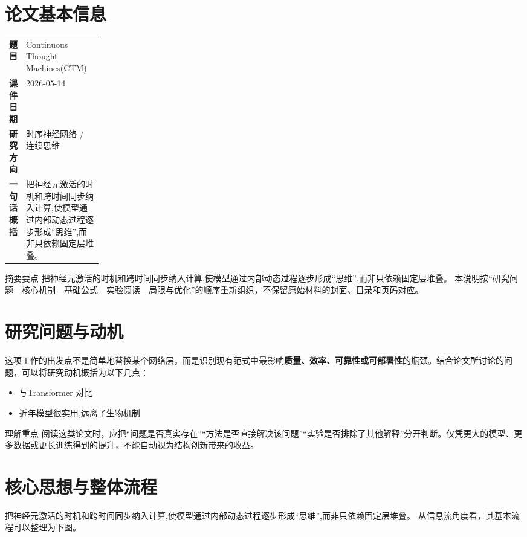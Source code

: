 \documentclass[UTF8,11pt,a4paper]{ctexart}
\newcommand{\term}[1]{\textbf{\textcolor{mainblue}{#1}}}
\begin{document}
\section{论文基本信息}
\begin{center}
\begin{tabularx}{0.94\linewidth}{>{\bfseries}p{0.18\linewidth}X}
\toprule
题目 & Continuous Thought Machines(CTM)\\
课件日期 & 2026-05-14\\
研究方向 & 时序神经网络 / 连续思维\\
一句话概括 & 把神经元激活的时机和跨时间同步纳入计算,使模型通过内部动态过程逐步形成“思维”,而非只依赖固定层堆叠。\\
\bottomrule
\end{tabularx}
\end{center}

\begin{infobox}{摘要要点}
把神经元激活的时机和跨时间同步纳入计算,使模型通过内部动态过程逐步形成“思维”,而非只依赖固定层堆叠。 本说明按“研究问题—核心机制—基础公式—实验阅读—局限与优化”的顺序重新组织，不保留原始材料的封面、目录和页码对应。
\end{infobox}

\section{研究问题与动机}
这项工作的出发点不是简单地替换某个网络层，而是识别现有范式中最影响\term{质量、效率、可靠性或可部署性}的瓶颈。结合论文所讨论的问题，可以将研究动机概括为以下几点：
\begin{itemize}
\item 与Transformer 对比
\item 近年模型很实用,远离了生物机制
\end{itemize}

\begin{notebox}{理解重点}
阅读这类论文时，应把“问题是否真实存在”“方法是否直接解决该问题”“实验是否排除了其他解释”分开判断。仅凭更大的模型、更多数据或更长训练得到的提升，不能自动视为结构创新带来的收益。
\end{notebox}

\section{核心思想与整体流程}
把神经元激活的时机和跨时间同步纳入计算,使模型通过内部动态过程逐步形成“思维”,而非只依赖固定层堆叠。 从信息流角度看，其基本流程可以整理为下图。
\end{document}
